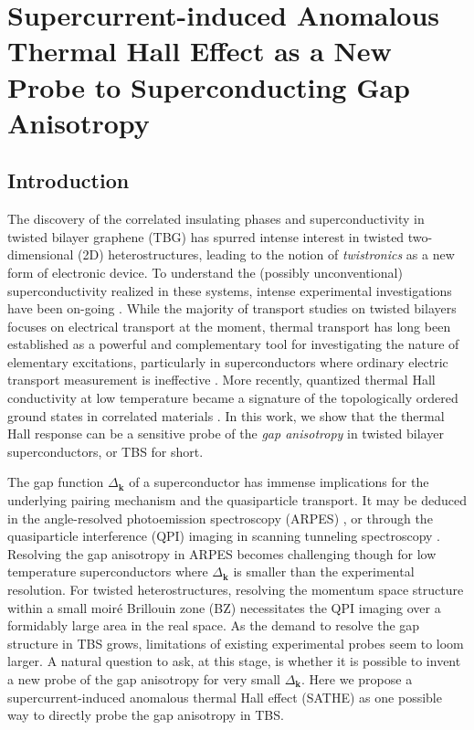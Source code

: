 \chapter{Supercurrent-induced Anomalous Thermal Hall Effect as a New Probe to Superconducting Gap Anisotropy}

\section{Introduction}
The discovery of the correlated insulating phases and superconductivity in twisted bilayer graphene (TBG) \cite{cao2018unconventional,cao2018correlated} has spurred intense interest in twisted two-dimensional (2D) heterostructures, leading to the notion of \emph{twistronics} as a new form of electronic device. To understand the (possibly unconventional) superconductivity realized in these systems, intense experimental investigations have been on-going \cite{oh2021evidence,kim2022evidence,lake2022pairing}. While the majority of transport studies on twisted bilayers focuses on electrical transport at the moment, thermal transport has long been established as a powerful and complementary tool for investigating the nature of elementary excitations, particularly in superconductors where ordinary electric transport measurement is ineffective \cite{krishana1997plateaus,chiao2000low,sutherland2003thermal,durst2003weak,zhang2001giant,cvetkovic2015berry}. More recently, quantized thermal Hall conductivity at low temperature became a signature of the topologically ordered ground states in correlated materials \cite{banerjee2018observation,yokoi2021half}. In this work, we show that the thermal Hall response can be a sensitive probe of the {\it gap anisotropy} in twisted bilayer superconductors, or TBS for short. 

The gap function $\varDelta_{\bm{k}}$ of a superconductor has immense implications for the underlying pairing mechanism and the quasiparticle transport. It may be deduced in the angle-resolved photoemission spectroscopy (ARPES) \cite{shen1993anomalously,ding1996angle,zhang2016superconducting}, or through the quasiparticle interference (QPI) imaging in scanning tunneling spectroscopy \cite{hanaguri2007quasiparticle,sprau2017discovery}. Resolving the gap anisotropy in ARPES becomes challenging though for low temperature superconductors where $\varDelta_{\bm{k}}$ is smaller than the experimental resolution. For twisted heterostructures, resolving the momentum space structure within a small moir\'e Brillouin zone (BZ) necessitates the QPI imaging over a formidably large area in the real space. As the demand to resolve the gap structure in TBS grows, limitations of existing experimental probes seem to loom larger. A natural question to ask, at this stage, is whether it is possible to invent a new probe of the gap anisotropy for very small $\varDelta_{\bm{k}}$. Here we propose a supercurrent-induced anomalous thermal Hall effect (SATHE) as one possible way to directly probe the gap anisotropy in TBS. 

